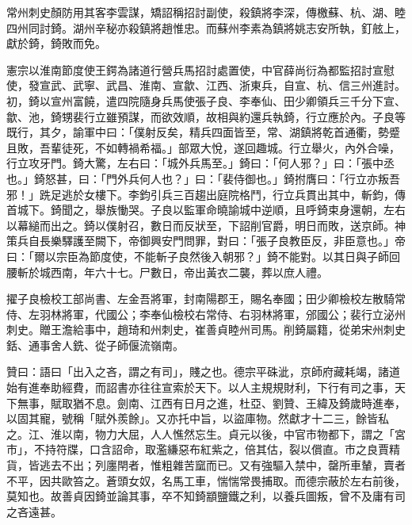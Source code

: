 \begin{pinyinscope}
 常州刺史顏防用其客李雲謀，矯詔稱招討副使，殺鎮將李深，傳檄蘇、杭、湖、睦四州同討錡。湖州辛秘亦殺鎮將趙惟忠。而蘇州李素為鎮將姚志安所執，釘舷上，獻於錡，錡敗而免。



 憲宗以淮南節度使王鍔為諸道行營兵馬招討處置使，中官薛尚衍為都監招討宣慰使，發宣武、武寧、武昌、淮南、宣歙、江西、浙東兵，自宣、杭、信三州進討。初，錡以宣州富饒，遣四院隨身兵馬使張子良、李奉仙、田少卿領兵三千分下宣、歙、池，錡甥裴行立雖預謀，而欲效順，故相與約還兵執錡，行立應於內。子良等既行，其夕，諭軍中曰：「僕射反矣，精兵四面皆至，常、湖鎮將乾首通衢，勢蹙且敗，吾輩徒死，不如轉禍希福。」部眾大悅，遂回趣城。行立舉火，內外合噪，行立攻牙門。錡大驚，左右曰：「城外兵馬至。」錡曰：「何人邪？」曰：「張中丞也。」錡怒甚，曰：「門外兵何人也？」曰：「裴侍御也。」錡拊膺曰：「行立亦叛吾邪！」跣足逃於女樓下。李鈞引兵三百趨出庭院格鬥，行立兵貫出其中，斬鈞，傳首城下。錡聞之，舉族慟哭。子良以監軍命曉諭城中逆順，且呼錡束身還朝，左右以幕縋而出之。錡以僕射召，數日而反狀至，下詔削官爵，明日而敗，送京師。神策兵自長樂驛護至闕下，帝御興安門問罪，對曰：「張子良教臣反，非臣意也。」帝曰：「爾以宗臣為節度使，不能斬子良然後入朝邪？」錡不能對。以其日與子師回腰斬於城西南，年六十七。尸數日，帝出黃衣二襲，葬以庶人禮。



 擢子良檢校工部尚書、左金吾將軍，封南陽郡王，賜名奉國；田少卿檢校左散騎常侍、左羽林將軍，代國公；李奉仙檢校右常侍、右羽林將軍，邠國公；裴行立泌州刺史。贈王澹給事中，趙琦和州刺史，崔善貞睦州司馬。削錡屬籍，從弟宋州刺史銛、通事舍人銑、從子師偃流嶺南。



 贊曰：語曰「出入之吝，謂之有司」，賤之也。德宗平硃泚，京師府藏耗竭，諸道始有進奉助經費，而詔書亦往往宣索於天下。以人主規規財利，下行有司之事，天下無事，賦取猶不息。劍南、江西有日月之進，杜亞、劉贊、王緯及錡歲時進奉，以固其寵，號稱「賦外羨餘」。又亦托中旨，以盜庫物。然獻才十二三，餘皆私之。江、淮以南，物力大屈，人人憔然忘生。貞元以後，中官市物都下，謂之「宮市」，不持符牒，口含詔命，取濫縑惡布紅紫之，倍其估，裂以償直。市之良賈精貨，皆逃去不出；列廛閈者，惟粗雜苦窳而已。又有強驅入禁中，罄所車輦，賣者不平，因共歐笞之。蒼頭女奴，名馬工車，惴惴常畏捕取。而德宗蔽於左右前後，莫知也。故善貞因錡並論其事，卒不知錡顓鹽鐵之利，以養兵圖叛，曾不及庸有司之吝遠甚。



\end{pinyinscope}